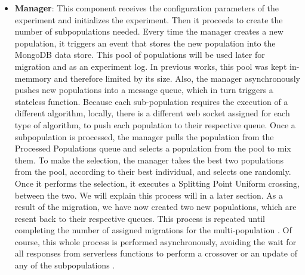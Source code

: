 \documentclass[runningheads]{llncs}
\begin{document}
\begin{itemize}
  \item {\bf Manager}: This component receives the configuration parameters of
  the experiment and initializes the experiment. Then it proceeds to create the
  number of subpopulations needed. Every time the manager creates a new
  population, it triggers an event that stores the new population into the
  MongoDB data store. This pool of populations will be used later for migration
  and as an experiment log. In previous works, this pool was kept in-memmory and
  therefore limited by its size. 
  Also, the manager asynchronously pushes new populations into a message queue,
  which in turn triggers a stateless function. Because each sub-population
  requires the execution of a different algorithm, locally, there is a different
  web socket assigned for each type of algorithm, to push each population to
  their respective queue. Once a subpopulation is processed, the manager pulls
  the population from the Processed Populations queue and selects a population
  from the pool to mix them. To make the selection, the manager takes the best
  two populations from the pool, according to their best individual, and selects
  one randomly. Once it performs the selection, it executes a Splitting Point
  Uniform crossing, between the two. We will explain this process will in a
  later section.  As a result of the migration, we have now created two new
  populations, which are resent back to their respective queues. This process is
  repeated until completing the number of assigned migrations for the
  multi-population \cite{Ma2019,Santander-jim2018}. Of course, this whole
  process is performed asynchronously, avoiding the wait for all responses from
  serverless functions to perform a crossover or an update of any of the
  subpopulations \cite{Lovbjerg2001,Jimeno2019}. 


\end{itemize}
\end{document}
